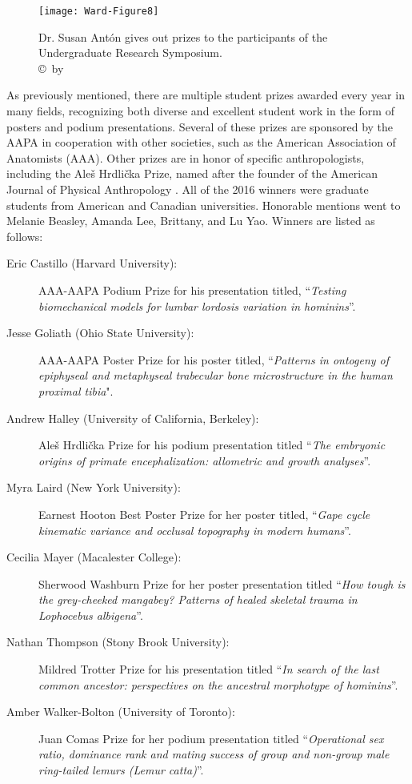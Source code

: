 \documentclass[english]{ijsra}
\begin{document}
	\begin{figure}[!htb] %
		\texttt{[image: Ward-Figure8]}
		\caption{Dr. Susan Antón gives out prizes to the participants of the Undergraduate Research Symposium.
				{\normalfont\scriptsize \\ \copyright\ by \shortauthor}}
		\label{fig:Ward-Figure8}
	\end{figure}

As previously mentioned, there are multiple student prizes awarded every year in many fields,
recognizing both diverse and excellent student work in the form of posters and podium presentations. 
Several of these prizes are sponsored by the AAPA in cooperation with other societies,
such as the American Association of Anatomists (AAA). 
Other prizes are in honor of specific anthropologists, including the Aleš Hrdlička Prize,
named after the founder of the American Journal of Physical Anthropology \parencite{american}.
All of the 2016 winners were graduate students from American and Canadian universities. 
Honorable mentions went to Melanie Beasley, Amanda Lee, Brittany, and Lu Yao.  
Winners are listed as follows: 
\begin{description}
  \item[Eric Castillo (Harvard University):] AAA-AAPA Podium Prize for his presentation titled, “\emph{Testing biomechanical models for lumbar lordosis variation in hominins}”.
  \item[Jesse Goliath (Ohio State University):] AAA-AAPA Poster Prize for his poster titled, “\emph{Patterns in ontogeny of epiphyseal and metaphyseal trabecular bone microstructure in the human proximal tibia}".
  \item[Andrew Halley (University of California, Berkeley):] Aleš Hrdlička Prize for his podium presentation titled “\emph{The embryonic origins of primate encephalization: allometric and growth analyses}”.
  \item[Myra Laird (New York University):] Earnest Hooton Best Poster Prize for her poster titled, “\emph{Gape cycle kinematic variance and occlusal topography in modern humans}”.
  \item[Cecilia Mayer (Macalester College):] Sherwood Washburn Prize for her poster presentation titled “\emph{How tough is the grey-cheeked mangabey? Patterns of healed skeletal trauma in \emph{Lophocebus albigena}}”.
  \item[Nathan Thompson (Stony Brook University):] Mildred Trotter Prize for his presentation titled “\emph{In search of the last common ancestor: perspectives on the ancestral morphotype of hominins}”.
  \item[Amber Walker-Bolton (University of Toronto):] Juan Comas Prize for her podium presentation titled “\emph{Operational sex ratio, dominance rank and mating success of group and non-group male ring-tailed lemurs \emph{(Lemur catta)}}”.
\end{description}
\end{document}
